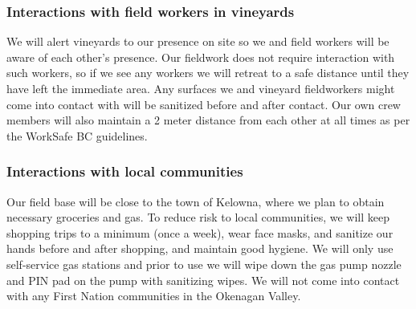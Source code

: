 \documentclass[11pt,letter]{article}
\begin{document}
\subsubsection{Interactions with field workers in vineyards}
We will alert vineyards to our presence on site so we and field workers will be aware of each other's presence. Our fieldwork does not require interaction with such workers, so if we see any workers we will retreat to a safe distance until they have left the immediate area. Any surfaces we and vineyard fieldworkers might come into contact with will be sanitized before and after contact. Our own crew members will also maintain a 2 meter distance from each other at all times as per the WorkSafe BC guidelines.   

\subsubsection{Interactions with local communities}
Our field base will be close to the town of Kelowna, where we plan to obtain necessary groceries and gas. To reduce risk to local communities, we will keep shopping trips to a minimum (once a week), wear face masks, and sanitize our hands before and after shopping, and maintain good hygiene. We will only use self-service gas stations and prior to use we will wipe down the gas pump nozzle and PIN pad on the pump with sanitizing wipes. We will not come into contact with any First Nation communities in the Okenagan Valley. 
\end{document}
